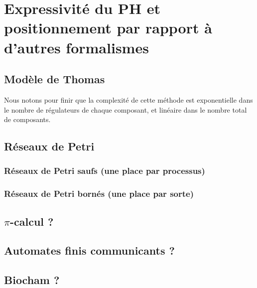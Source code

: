 
\chapter{Expressivité du PH et positionnement par rapport à d'autres formalismes}

\section{Modèle de Thomas}
Nous notons pour finir que la complexité de cette méthode est exponentielle dans le nombre
de régulateurs de chaque composant, et linéaire dans le nombre total de composants.

\section{Réseaux de Petri}
  \subsection{Réseaux de Petri saufs (une place par processus)}
  \subsection{Réseaux de Petri bornés (une place par sorte)}

\section{$\pi$-calcul ?}

\section{Automates finis communicants ?}

\section{Biocham ?}
